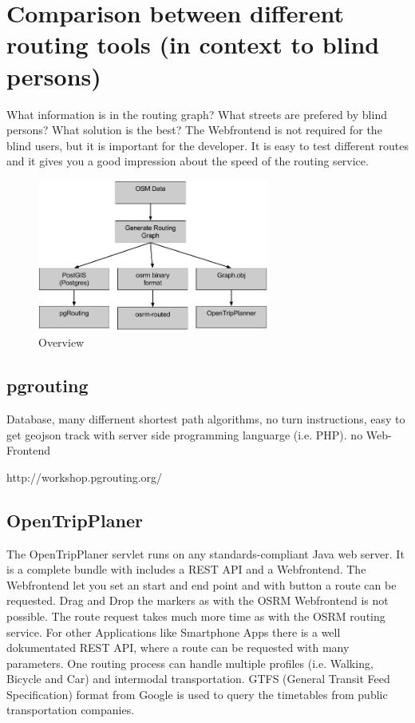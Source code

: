 \documentclass{sig-alternate}
\begin{document}
\section{Comparison between different routing tools (in context to blind persons)}

What information is in the routing graph? What streets are prefered by blind persons? What solution is the best?
The Webfrontend is not required for the blind users, but it is important for the developer. It is easy to test different routes and it gives you a good impression about the speed of the routing service.

\begin{figure}
\centering
\includegraphics[width=3in]{Overview2.png}
\caption{Overview}
\end{figure}

\subsection{pgrouting\cite{pgrouting}}
Database, many differnent shortest path algorithms, no turn instructions, easy to get geojson track with server side programming languarge (i.e. PHP). no Web-Frontend

http://workshop.pgrouting.org/



\subsection{OpenTripPlaner}
 
The OpenTripPlaner servlet runs on any standards-compliant Java web server. It is a complete bundle with includes a REST API and a Webfrontend. The Webfrontend let you set an start and end point and with button a route can be requested. Drag and Drop the markers as with the OSRM Webfrontend is not possible. The route request takes much more time as with the OSRM routing service. For other Applications like Smartphone Apps there is a well dokumentated REST API, where a route can be requested with many parameters. One routing process can handle multiple profiles (i.e. Walking, Bicycle and Car) and intermodal transportation. GTFS (General Transit Feed Specification) format from Google is used to query the timetables from public transportation companies. 
\end{document}
